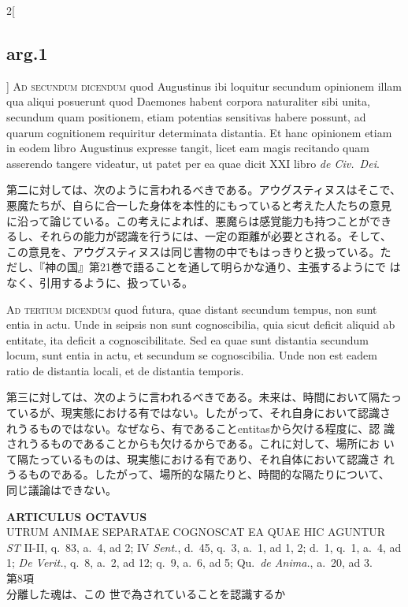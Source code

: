 \documentclass[paper=a4paper,fontsize=10pt,jafontsize=9pt,titlepage]{jlreq}
\begin{document}
\begin{paracol}{2}[\subsection{arg.1}]
{\scshape Ad secundum dicendum} quod Augustinus ibi loquitur secundum
opinionem illam qua aliqui posuerunt quod Daemones habent corpora
naturaliter sibi unita, secundum quam positionem, etiam potentias
sensitivas habere possunt, ad quarum cognitionem requiritur
determinata distantia. Et hanc opinionem etiam in eodem libro
Augustinus expresse tangit, licet eam magis recitando quam asserendo
tangere videatur, ut patet per ea quae dicit XXI libro {\itshape de
Civ.~Dei}.

\switchcolumn

第二に対しては、次のように言われるべきである。アウグスティヌスはそこで、
悪魔たちが、自らに合一した身体を本性的にもっていると考えた人たちの意見
に沿って論じている。この考えによれば、悪魔らは感覚能力も持つことができ
るし、それらの能力が認識を行うには、一定の距離が必要とされる。そして、
この意見を、アウグスティヌスは同じ書物の中でもはっきりと扱っている。た
だし、『神の国』第21巻で語ることを通して明らかな通り、主張するようにで
はなく、引用するように、扱っている。

\switchcolumn*[\subsection{ad.3}]

{\scshape Ad tertium dicendum} quod futura, quae distant secundum tempus,
non sunt entia in actu. Unde in seipsis non sunt cognoscibilia, quia
sicut deficit aliquid ab entitate, ita deficit a cognoscibilitate. Sed
ea quae sunt distantia secundum locum, sunt entia in actu, et secundum
se cognoscibilia. Unde non est eadem ratio de distantia locali, et de
distantia temporis.

\switchcolumn

第三に対しては、次のように言われるべきである。未来は、時間において隔たっ
ているが、現実態における有ではない。したがって、それ自身において認識さ
れうるものではない。なぜなら、有であることentitasから欠ける程度に、認
識されうるものであることからも欠けるからである。これに対して、場所にお
いて隔たっているものは、現実態における有であり、それ自体において認識さ
れうるものである。したがって、場所的な隔たりと、時間的な隔たりについて、
同じ議論はできない。

\end{paracol}

\newpage
{}

{}
\setcounter{section}{8}
\setcounter{subsection}{0}
\begin{center}
{\Large {\bfseries ARTICULUS OCTAVUS}}\\ {\large UTRUM ANIMAE SEPARATAE
COGNOSCAT EA QUAE HIC AGUNTUR}\\ {\footnotesize {\itshape ST} II-II, q.~83,
a.~4, ad 2; IV {\itshape Sent.}, d.~45, q.~3, a.~1, ad 1, 2; d.~1, q.~1,
a.~4, ad 1; {\itshape De Verit.}, q.~8, a.~2, ad 12; q.~9, a.~6, ad 5;
Qu.~{\itshape de Anima.}, a.~20, ad 3.}\\ {\Large 第8項\\分離した魂は、この
世で為されていることを認識するか}
\end{center}
\end{document}
